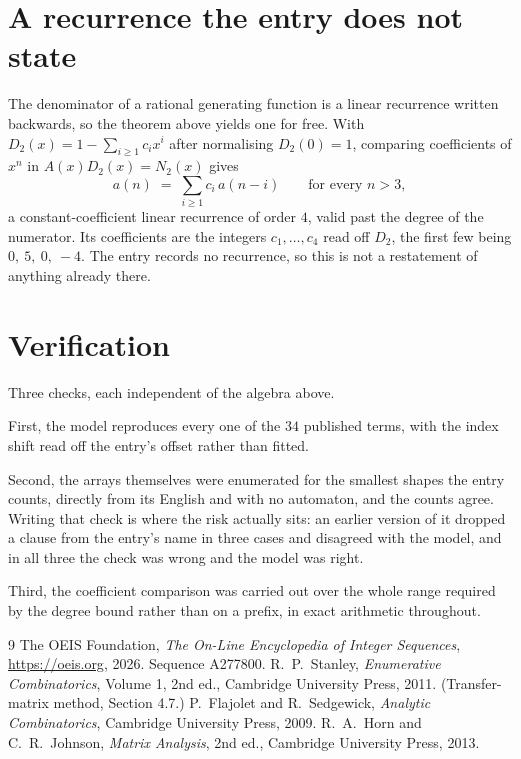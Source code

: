 \documentclass[11pt,a4paper]{article}
\theoremstyle{plain}
\theoremstyle{definition}
\begin{document}
\section{A recurrence the entry does not state}

The denominator of a rational generating function is a linear recurrence written backwards, so
the theorem above yields one for free. With $D_2(x)=1-\sum_{i\ge1}c_ix^i$ after normalising
$D_2(0)=1$, comparing coefficients of $x^n$ in $A(x)D_2(x)=N_2(x)$ gives
\[
a(n)\;=\;\sum_{i\ge1}c_i\,a(n-i)\qquad\text{for every }n>3,
\]
a constant-coefficient linear recurrence of order $4$, valid past the degree of the
numerator. Its coefficients are the integers $c_1,\dots,c_{4}$ read off $D_2$, the first few being $0,\ 5,\ 0,\ -4$. The entry records no recurrence, so this is not a restatement of anything
already there.

\section{Verification}

Three checks, each independent of the algebra above.

First, the model reproduces every one of the $34$ published terms, with the index shift
read off the entry's offset rather than fitted.

Second, the arrays themselves were enumerated for the smallest shapes the entry counts,
directly from its English and with no automaton, and the counts agree. Writing that check is
where the risk actually sits: an earlier version of it dropped a clause from the entry's name
in three cases and disagreed with the model, and in all three the check was wrong and the model
was right.

Third, the coefficient comparison was carried out over the whole range required by the degree
bound rather than on a prefix, in exact arithmetic throughout.

\begin{thebibliography}{9}
 The OEIS Foundation, \emph{The On-Line Encyclopedia of Integer
Sequences}, \url{https://oeis.org}, 2026. Sequence A277800.
 R.~P.~Stanley, \emph{Enumerative Combinatorics}, Volume 1, 2nd ed.,
Cambridge University Press, 2011. (Transfer-matrix method, Section 4.7.)
 P.~Flajolet and R.~Sedgewick, \emph{Analytic Combinatorics}, Cambridge
University Press, 2009.
 R.~A.~Horn and C.~R.~Johnson, \emph{Matrix Analysis}, 2nd ed., Cambridge
University Press, 2013.
\end{thebibliography}
\end{document}
